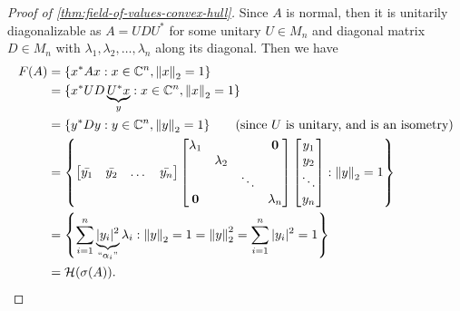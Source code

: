 \begin{proof}[Proof of \ref{thm:field-of-values-convex-hull}]
Since $A$ is normal, then it is unitarily diagonalizable as $A = UDU^*$ for some unitary $U \in M_n$ and diagonal matrix $D \in M_n$ with $\lambda_1, \lambda_2, \dots, \lambda_n$ along its diagonal. Then we have
\begin{align*}
    F(A) 
        &= \{x^*Ax : x \in \mathbb C^n, \left\lVert x\right\rVert_2 = 1\} \\
        &= \{x^*UD\underbrace{U^*x}_{y} : x \in \mathbb C^n, \left\lVert x\right\rVert_2 = 1\} \\
        &= \{y^*Dy : y \in \mathbb C^n, \left\lVert y\right\rVert_2 = 1\} \quad \quad \text{(since } U \text{ is unitary, and is an isometry)} \\
        &= \left\{
            \begin{bmatrix} \Bar{y_1} & \Bar{y_2} & \dots & \Bar{y_n}  \end{bmatrix} 
            \begin{bmatrix}
                \lambda_1 & & & \mathbf{0} \\
                & \lambda_2 & & \\
                & & \ddots & \\
                \mathbf{0} & & & \lambda_n
            \end{bmatrix}
            \begin{bmatrix}
            y_1 \\ y_2 \\ \ddots \\ y_n
            \end{bmatrix}: \left\lVert y\right\rVert_2 = 1\right\} \\
        &= \left\{\sum_{i=1}^n \underbrace{|y_i|^2}_{``\alpha_i"} \lambda_i : \left\lVert y\right\rVert_2 = 1 = \left\lVert y\right\rVert_2^2 = \sum_{i=1}^n |y_i|^2 = 1 \right\} \\
        &= \mathcal{H}(\sigma(A)).
\end{align*}


\end{proof}
